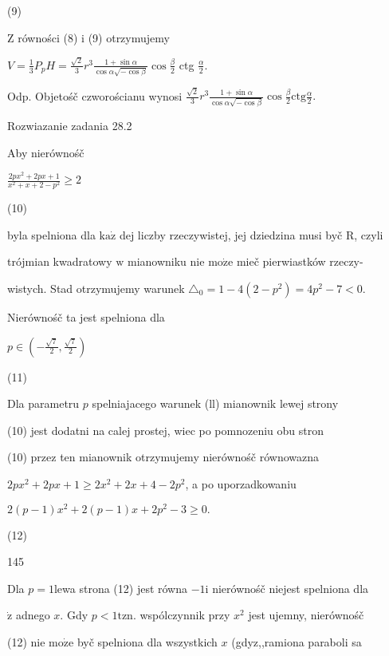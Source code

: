 \documentclass[a4paper,12pt]{article}
\begin{document}
(9)

$\mathrm{Z}$ równości (8) $\mathrm{i}$ (9) otrzymujemy

$V=\displaystyle \frac{1}{3}P_{p}H=\frac{\sqrt{2}}{3}r^{3}\frac{1+\sin\alpha}{\cos\alpha\sqrt{-\cos\beta}}\cos\frac{\beta}{2}$ ctg $\displaystyle \frac{\alpha}{2}.$

Odp. Objetośč czworościanu wynosi $\displaystyle \frac{\sqrt{2}}{3}r^{3}\frac{1+\sin\alpha}{\cos\alpha\sqrt{-\cos\beta}}\cos\frac{\beta}{2}\mathrm{c}\mathrm{t}\mathrm{g}\frac{\alpha}{2}.$

Rozwiazanie zadania 28.2

Aby nierównośč

$\displaystyle \frac{2px^{2}+2px+1}{x^{2}+x+2-p^{2}}\geq 2$

(10)

byla spelniona dla $\mathrm{k}\mathrm{a}\dot{\mathrm{z}}$ dej liczby rzeczywistej, jej dziedzina musi byč $\mathrm{R}$, czyli

trójmian kwadratowy $\mathrm{w}$ mianowniku nie $\mathrm{m}\mathrm{o}\dot{\mathrm{z}}\mathrm{e}$ mieč pierwiastków rzeczy-

wistych. Stad otrzymujemy warunek $\triangle_{0} = 1-4(2-p^{2}) =4p^{2}-7< 0.$

Nierównośč ta jest spelniona dla

$p\displaystyle \in(-\frac{\sqrt{7}}{2},\frac{\sqrt{7}}{2})$

(11)

Dla parametru $p$ spelniajacego warunek (ll) mianownik lewej strony

(10) jest dodatni na calej prostej, wiec po pomnozeniu obu stron

(10) przez ten mianownik otrzymujemy nierównośč równowazna

$2px^{2}+2px+1\geq 2x^{2}+2x+4-2p^{2}$, a po uporzadkowaniu

$2(p-1)x^{2}+2(p-1)x+2p^{2}-3\geq 0.$

(12)





145

Dla $p=1$lewa strona (12) jest równa $-1\mathrm{i}$ nierównośč niejest spelniona dla

$\dot{\mathrm{z}}$ adnego $x$. Gdy $p<1\mathrm{t}\mathrm{z}\mathrm{n}$. wspólczynnik przy $x^{2}$ jest ujemny, nierównośč

(12) nie $\mathrm{m}\mathrm{o}\dot{\mathrm{z}}\mathrm{e}$ byč spelniona dla wszystkich $x$ (gdyz,,ramiona paraboli sa
\end{document}
